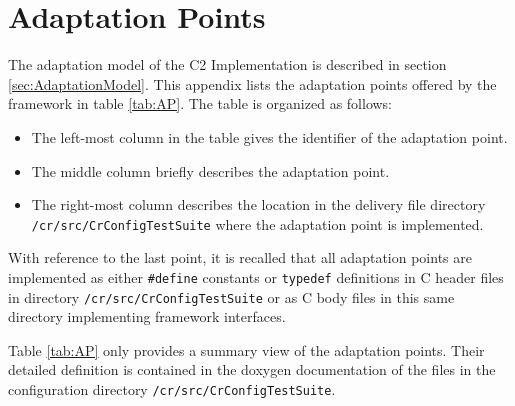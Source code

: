 \documentclass{pnp_article}
\begin{document}
\appendix
\section{Adaptation Points}\label{sec:AdaptationPoints}
The adaptation model of the C2 Implementation is described in section \ref{sec:AdaptationModel}. This appendix lists the adaptation points offered by the framework in table \ref{tab:AP}. The table is organized as follows:

\begin{itemize}
\item The left-most column in the table gives the identifier of the adaptation point. \item The middle column briefly describes the adaptation point.
\item The right-most column describes the location in the delivery file directory \texttt{/cr/src/CrConfigTestSuite} where the adaptation point is implemented.
\end{itemize}

With reference to the last point, it is recalled that all adaptation points are implemented as either \texttt{\#define} constants or \texttt{typedef} definitions in C header files in directory \texttt{/cr/src/CrConfigTestSuite} or as C body files in this same directory implementing framework interfaces.

Table \ref{tab:AP} only provides a summary view of the adaptation points. Their detailed definition is contained in the doxygen documentation of the files in the configuration directory \texttt{/cr/src/CrConfigTestSuite}.  

\begin{landscape}


\end{landscape}
\end{document}
